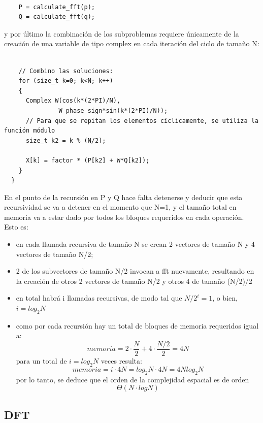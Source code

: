 \documentclass{article}
\begin{document}
\begin{verbatim}
 
    P = calculate_fft(p);
    Q = calculate_fft(q);
\end{verbatim}   

y por último la combinación de los subproblemas requiere únicamente de la creación de una variable de tipo complex en cada iteración del ciclo de tamaño N:

 \begin{verbatim}
 
    // Combino las soluciones:
    for (size_t k=0; k<N; k++)
    {
      Complex W(cos(k*(2*PI)/N),
               W_phase_sign*sin(k*(2*PI)/N));
      // Para que se repitan los elementos cíclicamente, se utiliza la función módulo
      size_t k2 = k % (N/2);

      X[k] = factor * (P[k2] + W*Q[k2]);
    } 
  }

\end{verbatim}


En el punto de la recursión en P y Q hace falta detenerse y deducir que esta recursividad se va a detener en el momento que N=1, y el tamaño total en memoria va a estar dado por todos los bloques requeridos en cada operación. Esto es:
\begin{itemize}
\item en cada llamada recursiva de tamaño N se crean 2 vectores de tamaño N y 4 vectores de tamaño N/2;
\item 2 de los subvectores de tamaño N/2 invocan a fft nuevamente, resultando en la creación de otros 2 vectores de tamaño N/2 y otros 4 de tamaño (N/2)/2
\item en total habrá i llamadas recursivas, de modo tal que $N/2^i=1$, o bien, $i=log_2N$
\item como por cada recursión hay un total de bloques de memoria requeridos igual a: \[memoria=2\cdot\frac{N}{2}+4\cdot \frac{N/2}{2} = 4N\]
para un total de $i=log_2N$ veces resulta:\\
\[memoria=i\cdot 4N = log_2N\cdot 4N=4Nlog_2N\]
por lo tanto, se deduce que el orden de la complejidad espacial es de orden  $$ \boxed{\Theta(N\cdot logN)}$$
\end{itemize}
  
  

    \subsection{DFT}
\end{document}
